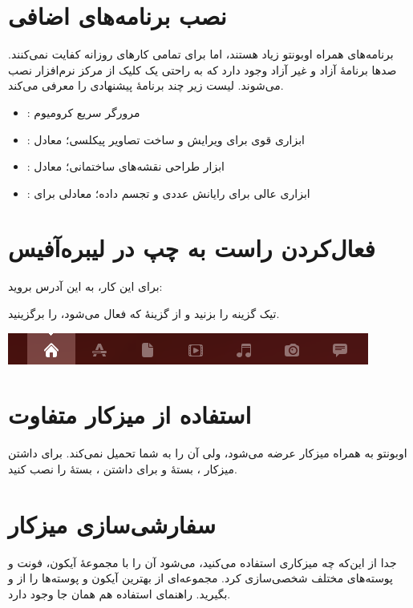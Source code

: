 \section{نصب برنامه‌های اضافی}
برنامه‌های همراه اوبونتو زیاد هستند، اما برای تمامی کارهای روزانه کفایت نمی‌کنند. صدها برنامهٔ آزاد و غیر آزاد وجود دارد که به راحتی یک کلیک از مرکز نرم‌افزار نصب می‌شوند. لیست زیر چند برنامهٔ پیشنهادی را معرفی می‌کند.
\begin{itemize}
\item {}: مرورگر سریع کرومیوم
\item {}: ابزاری قوی برای ویرایش و ساخت تصاویر پیکلسی؛ معادل 
\item {}: ابزار طراحی نقشه‌های ساختمانی؛ معادل 
\item {}: ابزاری عالی برای رایانش عددی و تجسم داده؛ معادلی برای 
\end{itemize}

\section{فعال‌کردن راست به چپ در لیبره‌آفیس}
برای این کار، به این آدرس بروید:\\
\begin{flushleft}
\end{flushleft}
تیک گزینه  را بزنید و از گزینهٔ  که فعال می‌شود،  را برگزینید.

\begin{center}
\includegraphics[scale=0.43]{pics/24.png}
\end{center}

\section{استفاده از میزکار متفاوت}
اوبونتو به همراه میزکار  عرضه می‌شود، ولی آن را به شما تحمیل نمی‌کند. برای داشتن میزکار ، بستهٔ  و برای داشتن ، بستهٔ  را نصب کنید.

\section{سفارشی‌سازی میزکار}
جدا از این‌که چه میزکاری استفاده می‌کنید، می‌شود آن را با مجموعهٔ آیکون، فونت و پوسته‌های مختلف شخصی‌سازی کرد. مجموعه‌ای از بهترین آیکون و پوسته‌ها را از  و  بگیرید. راهنمای استفاده هم همان جا وجود دارد.

